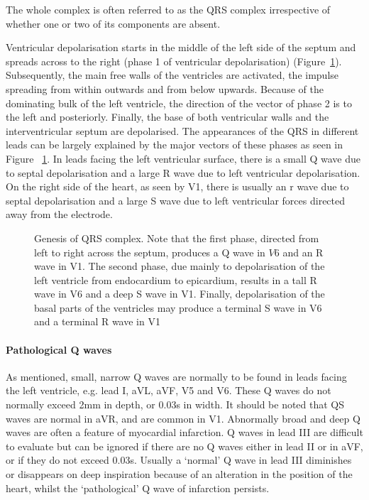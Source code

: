 The whole complex is often referred to as the QRS complex irrespective of
whether one or two of its components are absent.

Ventricular depolarisation starts in the middle of the left side of the septum
and spreads across to the right (phase 1 of ventricular depolarisation)
(Figure~\ref{fig:heartqrs}). Subsequently, the main free walls of the
ventricles are activated, the impulse spreading from within outwards and from
below upwards. Because of the dominating bulk of the left ventricle, the
direction of the vector of phase 2 is to the left and posteriorly. Finally,
the base of both ventricular walls and the interventricular septum are
depolarised. The appearances of the QRS in different leads can be largely
explained by the major vectors of these phases as seen in Figure
~\ref{fig:heartqrs}. In leads facing the left ventricular surface, there is a
small Q wave due to septal depolarisation and a large R wave due to left
ventricular depolarisation. On the right side of the heart, as seen by V1,
there is usually an r wave due to septal depolarisation and a large S wave
due to left ventricular forces directed away from the electrode.

\begin{figure}[htbp] \centering
 \caption[Genesis of QRS complex.]{Genesis of QRS complex. Note that the first phase, directed from
   left to right across the septum, produces a Q wave in $V6$ and an R wave in
   V1. The second phase, due mainly to depolarisation of the left ventricle
   from endocardium to epicardium, results in a tall R wave in V6 and a deep
   S wave in V1. Finally, depolarisation of the basal parts of the
   ventricles may produce a terminal S wave in V6 and a terminal R wave in V1}
  \label{fig:heartqrs}
\end{figure}

\paragraph{Pathological Q waves}
As mentioned, small, narrow Q waves are normally to be found in leads facing
the left ventricle, e.g. lead I, aVL, aVF, V5 and V6. These Q waves do not
normally exceed 2mm in depth, or 0.03s in width. It should be noted that QS
waves are normal in aVR, and are common in V1. Abnormally broad and deep Q
waves are often a feature of myocardial infarction. Q waves in lead III are
difficult to evaluate but can be ignored if there are no Q waves either in
lead II or in aVF, or if they do not exceed 0.03s. Usually a `normal' Q
wave in lead III diminishes or disappears on deep inspiration because of an
alteration in the position of the heart, whilst the `pathological' Q wave of
infarction persists.

